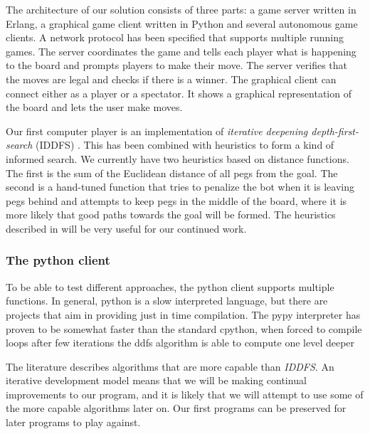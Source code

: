 \documentclass[a4paper,11pt]{article}
\begin{document}
The architecture of our solution consists of three parts: a game
server written in Erlang, a graphical game client written in Python
and several autonomous game clients. A network protocol has been
specified that supports multiple running games. The server coordinates
the game and tells each player what is happening to the board and
prompts players to make their move. The server verifies that the moves
are legal and checks if there is a winner. The graphical client can
connect either as a player or a spectator. It shows a graphical
representation of the board and lets the user make moves.


Our first computer player is an implementation of \emph{iterative
  deepening depth-first-search} (IDDFS) \cite{aimodern}. This has been
combined with heuristics to form a kind of informed search. We
currently have two heuristics based on distance functions. The first
is the sum of the Euclidean distance of all pegs from the goal. The
second is a hand-tuned function that tries to penalize the bot when it
is leaving pegs behind and attempts to keep pegs in the middle of the
board, where it is more likely that good paths towards the goal will
be formed. The heuristics described in \cite{ulfhake} will be very
useful for our continued work.

\subsubsection{The python client}
To be able to test different approaches, the python client supports multiple
functions.
In general, python is a slow interpreted language, but there are projects that
aim in providing just in time compilation. The pypy interpreter has proven to be
somewhat faster than the standard cpython, when forced to compile loops after
few iterations the ddfs algorithm is able to compute one level deeper

The literature describes algorithms that are more capable than
\emph{IDDFS}. An iterative development model means that we will be
making continual improvements to our program, and it is likely that we
will attempt to use some of the more capable algorithms later on. Our
first programs can be preserved for later programs to play against.
\end{document}
